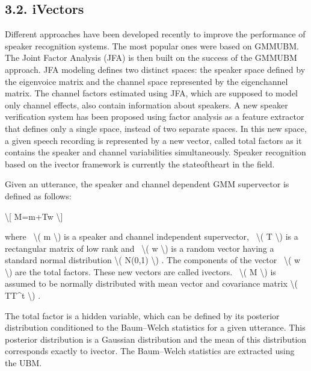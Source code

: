 \documentclass[letterpaper,10pt,english]{jupyterBook}
\begin{document}
\subsection{3.2. i\sphinxhyphen{}Vectors}
\label{\detokenize{Recognition/Speaker_Recognition_and_Verification:i-vectors}}
\sphinxAtStartPar
Different approaches have been developed recently to improve the
performance of speaker recognition systems. The most popular ones were
based on GMM\sphinxhyphen{}UBM. The Joint Factor Analysis (JFA) is then built on the
success of the GMM\sphinxhyphen{}UBM approach. JFA modeling defines two distinct
spaces: the speaker space defined by the eigenvoice matrix and the
channel space represented by the eigen\sphinxhyphen{}channel matrix. The channel
factors estimated using JFA, which are supposed to model only channel
effects, also contain information about speakers. A new speaker
verification system has been proposed using factor analysis as a feature
extractor that defines only a single space, instead of two separate
spaces. In this new space, a given speech recording is represented by a
new vector, called total factors as it contains the speaker and channel
variabilities simultaneously. Speaker recognition based on the i\sphinxhyphen{}vector
framework is currently the state\sphinxhyphen{}of\sphinxhyphen{}the\sphinxhyphen{}art in the field.

\sphinxAtStartPar
Given an utterance, the speaker and channel dependent GMM supervector is
defined as follows:

\sphinxAtStartPar
\textbackslash{}{[} M=m+Tw \textbackslash{}{]}

\sphinxAtStartPar
where  \textbackslash{}( m \textbackslash{}) is a speaker and channel independent supervector,  \textbackslash{}(
T \textbackslash{}) is a rectangular matrix of low rank and  \textbackslash{}( w \textbackslash{}) is a random
vector having a standard normal distribution \textbackslash{}( N(0,1) \textbackslash{}) . The
components of the vector  \textbackslash{}( w \textbackslash{}) are the total factors. These new
vectors are called i\sphinxhyphen{}vectors.  \textbackslash{}( M \textbackslash{}) is assumed to be normally
distributed with mean vector and covariance matrix \textbackslash{}( TT\textasciicircum{}t \textbackslash{}) .

\sphinxAtStartPar
The total factor is a hidden variable, which can be defined by its
posterior distribution conditioned to the Baum–Welch statistics for a
given utterance. This posterior distribution is a Gaussian distribution
and the mean of this distribution corresponds exactly to i\sphinxhyphen{}vector. The
Baum–Welch statistics are extracted using the UBM.
\end{document}
